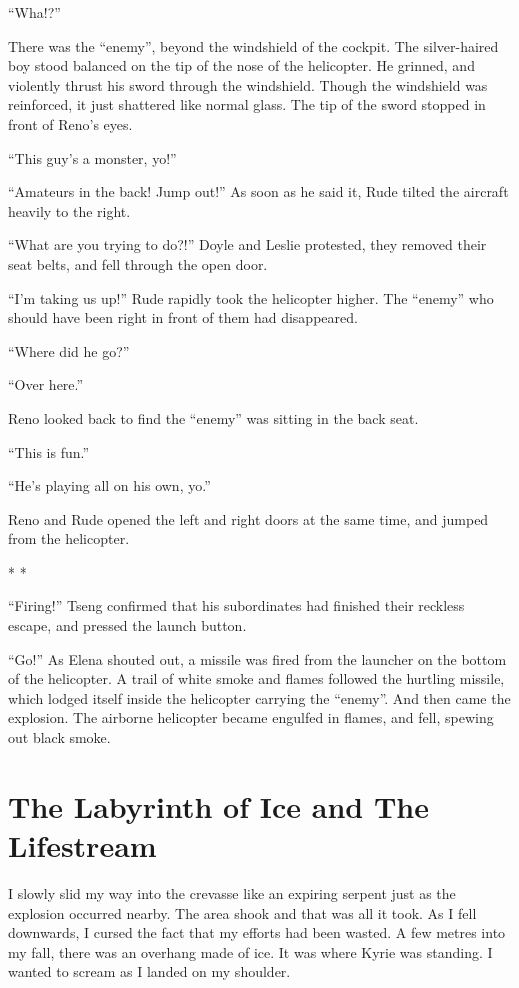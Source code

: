 \documentclass[oneside]{book}
\begin{document}
“Wha!?”

There was the “enemy”, beyond the windshield of the cockpit. The silver-haired boy stood balanced on the tip of the nose of the helicopter. He grinned, and violently thrust his sword through the windshield. Though the windshield was reinforced, it just shattered like normal glass. The tip of the sword stopped in front of Reno’s eyes.

“This guy’s a monster, yo!”

“Amateurs in the back! Jump out!” As soon as he said it, Rude tilted the aircraft heavily to the right.

“What are you trying to do?!” Doyle and Leslie protested, they removed their seat belts, and fell through the open door.

“I’m taking us up!” Rude rapidly took the helicopter higher. The “enemy” who should have been right in front of them had disappeared.

“Where did he go?”

“Over here.”

Reno looked back to find the “enemy” was sitting in the back seat.

“This is fun.”

“He’s playing all on his own, yo.”

Reno and Rude opened the left and right doors at the same time, and jumped from the helicopter.

* *

“Firing!” Tseng confirmed that his subordinates had finished their reckless escape, and pressed the launch button.

“Go!” As Elena shouted out, a missile was fired from the launcher on the bottom of the helicopter. A trail of white smoke and flames followed the hurtling missile, which lodged itself inside the helicopter carrying the “enemy”. And then came the explosion. The airborne helicopter became engulfed in flames, and fell, spewing out black smoke.

\chapter{The Labyrinth of Ice and The Lifestream}
I slowly slid my way into the crevasse like an expiring serpent just as the explosion occurred nearby. The area shook and that was all it took. As I fell downwards, I cursed the fact that my efforts had been wasted. A few metres into my fall, there was an overhang made of ice. It was where Kyrie was standing. I wanted to scream as I landed on my shoulder.
\end{document}
